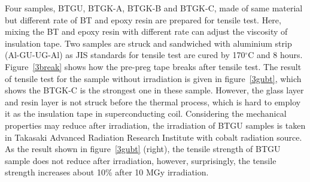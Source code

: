 Four samples, BTGU, BTGK-A, BTGK-B and BTGK-C, made of same material but different rate of BT and epoxy resin are prepared for tensile test.
Here, mixing the BT and epoxy resin with different rate can adjust the viscosity of insulation tape.
Two samples are struck and sandwiched with aluminium strip (Al-GU-UG-Al) as JIS standards for tensile test are cured by 170$^{\circ}$C and 8 hours.
Figure~\ref{3break} shows how the pre-preg tape breaks after tensile test.
The result of tensile test for the sample without irradiation is given in figure~\ref{3gubt}, which shows the BTGK-C is the strongest one in these sample.
However, the glass layer and resin layer is not struck before the thermal process, which is hard to employ it as the insulation tape in superconducting coil.
Considering the mechanical properties may reduce after irradiation, the irradiation of BTGU samples is taken in Takasaki Advanced Radiation Research Institute with cobalt radiation source.
As the result shown in figure~\ref{3gubt} (right), the tensile strength of BTGU sample does not reduce after irradiation, however, surprisingly, the tensile strength increases about 10\% after 10 MGy irradiation.
